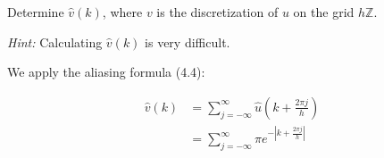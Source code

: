 Determine $\hat{v}(k)$, where $v$ is the discretization of $u$ on the grid $h \mathbb{Z}$.

\textit{Hint:} Calculating $\hat{v}(k)$ is very difficult.

\begin{solution}
  We apply the aliasing formula (4.4):

  \begin{align*}
    \hat{v}(k) &= \sum_{j=-\infty}^{\infty} \hat{u}\left( k + \frac{2\pi j}{h} \right) \\
               &= \sum_{j=-\infty}^{\infty} \pi e^{-\left\vert k + \frac{2\pi j}{h} \right\vert}
  \end{align*}
  \ \\
\end{solution}